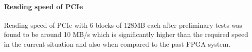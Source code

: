 \paragraph{Reading speed of PCIe\\}

Reading speed of PCIe with 6 blocks of 128MB each after preliminary tests was found to be around 10 MB/s which is significantly higher than
the required speed in the current situation and also when compared to the past FPGA system. 
